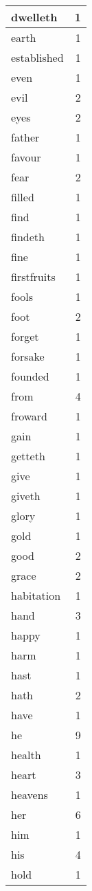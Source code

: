 \begin{center}
\begin{longtable}{l|r}
dwelleth & 1\\ \hline 
earth & 1\\ \hline 
established & 1\\ \hline 
even & 1\\ \hline 
evil & 2\\ \hline 
eyes & 2\\ \hline 
father & 1\\ \hline 
favour & 1\\ \hline 
fear & 2\\ \hline 
filled & 1\\ \hline 
find & 1\\ \hline 
findeth & 1\\ \hline 
fine & 1\\ \hline 
firstfruits & 1\\ \hline 
fools & 1\\ \hline 
foot & 2\\ \hline 
forget & 1\\ \hline 
forsake & 1\\ \hline 
founded & 1\\ \hline 
from & 4\\ \hline 
froward & 1\\ \hline 
gain & 1\\ \hline 
getteth & 1\\ \hline 
give & 1\\ \hline 
giveth & 1\\ \hline 
glory & 1\\ \hline 
gold & 1\\ \hline 
good & 2\\ \hline 
grace & 2\\ \hline 
habitation & 1\\ \hline 
hand & 3\\ \hline 
happy & 1\\ \hline 
harm & 1\\ \hline 
hast & 1\\ \hline 
hath & 2\\ \hline 
have & 1\\ \hline 
he & 9\\ \hline 
health & 1\\ \hline 
heart & 3\\ \hline 
heavens & 1\\ \hline 
her & 6\\ \hline 
him & 1\\ \hline 
his & 4\\ \hline 
hold & 1\\ \hline 

\end{longtable}
\end{center}
